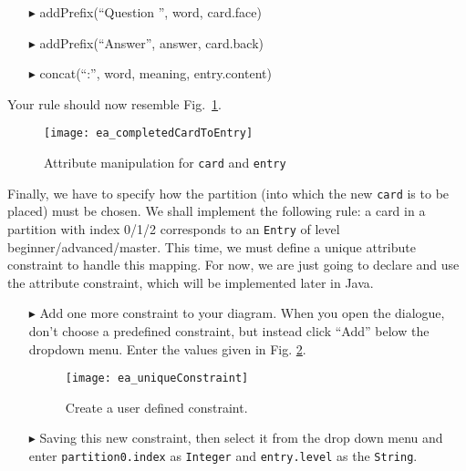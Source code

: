 \begin{enumerate}
  \item[$\blacktriangleright$] addPrefix(``Question '', word, card.face)
  \item[$\blacktriangleright$] addPrefix(``Answer'', answer, card.back)
  \item[$\blacktriangleright$] concat(``:'', word, meaning, entry.content)
\end{enumerate}

Your rule should now resemble Fig.~\ref{fig:cardtoentry_2}.

\begin{figure}[htbp]
\begin{center}
  \texttt{[image: ea\_completedCardToEntry]}
  \caption{Attribute manipulation for \texttt{card} and \texttt{entry}}
  \label{fig:cardtoentry_2}
\end{center}
\end{figure}
\FloatBarrier


Finally, we have to specify how the partition (into which the new \texttt{card} is to be placed) must be chosen.
We shall implement the following rule: a card in a partition with index 0/1/2 corresponds to an \texttt{Entry} of level beginner/advanced/master.
This time, we must define a unique attribute constraint to handle this mapping. For now, we are just going to declare and use the attribute constraint, which
will be implemented later in Java.

\begin{enumerate}
\item[$\blacktriangleright$] Add one more constraint to your diagram. When you open the dialogue, don't choose a predefined constraint, but instead click
``Add'' below the dropdown menu. Enter the values given in Fig. \ref{fig:create_new_constraint}.

\vspace{0.5cm}

\begin{figure}[htbp]
\begin{center}
  \texttt{[image: ea\_uniqueConstraint]}
  \caption{Create a user defined constraint.}
  \label{fig:create_new_constraint}
\end{center}
\end{figure}
\FloatBarrier

\item[$\blacktriangleright$] Saving this new constraint, then select it from the drop down menu and enter \texttt{partition0.index} as \texttt{Integer} and
\texttt{entry.level} as the \texttt{String}.
\end{enumerate}

